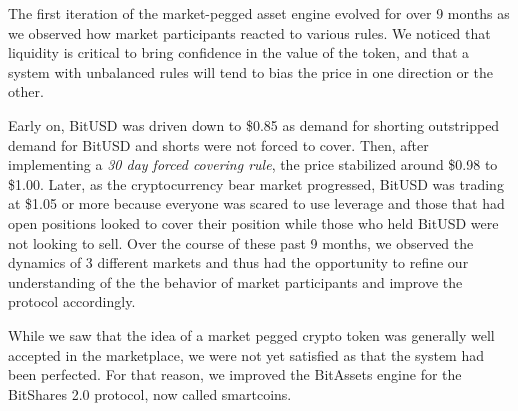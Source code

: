 \label{sec:bitassets1}

The first iteration of the market-pegged asset engine evolved for over 9
months as we observed how market participants reacted to various rules.
We noticed that liquidity is critical to bring confidence in the value
of the token, and that a system with unbalanced rules will tend to bias
the price in one direction or the other.

Early on, BitUSD was driven down to \$0.85 as demand for shorting
outstripped demand for BitUSD and shorts were not forced to cover. Then,
after implementing a \emph{30 day forced covering rule}, the price
stabilized around \$0.98 to \$1.00. Later, as the cryptocurrency bear
market progressed, BitUSD was trading at \$1.05 or more because everyone
was scared to use leverage and those that had open positions looked to
cover their position while those who held BitUSD were not looking to
sell. Over the course of these past 9 months, we observed the dynamics
of 3 different markets and thus had the opportunity to refine our
understanding of the the behavior of market participants and improve the
protocol accordingly.

While we saw that the idea of a market pegged crypto token was generally
well accepted in the marketplace, we were not yet satisfied as that the
system had been perfected. For that reason, we improved the BitAssets
engine for the BitShares 2.0 protocol, now called smartcoins.
